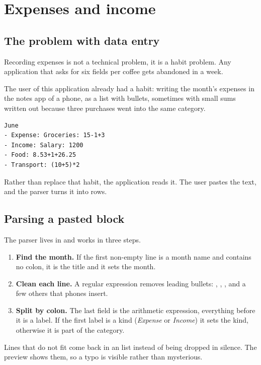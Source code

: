\chapter{Expenses and income}

\section{The problem with data entry}

Recording expenses is not a technical problem, it is a habit problem. Any
application that asks for six fields per coffee gets abandoned in a week.

The user of this application already had a habit: writing the month's expenses
in the notes app of a phone, as a list with bullets, sometimes with small sums
written out because three purchases went into the same category.

\begin{lstlisting}[style=sh]
June
- Expense: Groceries: 15-1+3
- Income: Salary: 1200
- Food: 8.53+1+26.25
- Transport: (10+5)*2
\end{lstlisting}

Rather than replace that habit, the application reads it. The user pastes the
text, and the parser turns it into rows.

\section{Parsing a pasted block}

The parser lives in  and works in three
steps.

\begin{enumerate}
  \item \textbf{Find the month.} If the first non-empty line is a month name and
        contains no colon, it is the title and it sets the month.
  \item \textbf{Clean each line.} A regular expression removes leading bullets:
        \code{-}, \code{*}, \code{\textbullet}, and a few others that phones
        insert.
  \item \textbf{Split by colon.} The last field is the arithmetic expression,
        everything before it is a label. If the first label is a kind
        (\emph{Expense} or \emph{Income}) it sets the kind, otherwise it is part
        of the category.
\end{enumerate}

Lines that do not fit come back in an  list instead of being
dropped in silence. The preview shows them, so a typo is visible rather than
mysterious.

